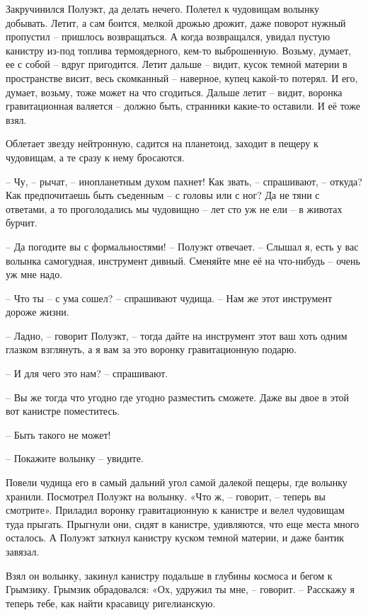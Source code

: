 \documentclass[ebook,oneside,final,openright]{memoir}
\begin{document}
\par
Закручинился Полуэкт, да делать нечего. Полетел к чудовищам волынку добывать. Летит, а сам боится, мелкой дрожью дрожит, даже поворот нужный пропустил – пришлось возвращаться. А когда возвращался, увидал пустую канистру из-под топлива термоядерного, кем-то выброшенную. Возьму, думает, ее с собой – вдруг пригодится. Летит дальше – видит, кусок темной материи в пространстве висит, весь скомканный – наверное, купец какой-то потерял. И его, думает, возьму, тоже может на что сгодиться. Дальше летит – видит, воронка гравитационная валяется – должно быть, странники какие-то оставили. И её тоже взял.\par
\par
Облетает звезду нейтронную, садится на планетоид, заходит в пещеру к чудовищам, а те сразу к нему бросаются. \par
– Чу, – рычат, – инопланетным духом пахнет! Как звать, – спрашивают, – откуда? Как предпочитаешь быть съеденным – с головы или с ног? Да не тяни с ответами, а то проголодались мы чудовищно – лет сто уж не ели – в животах бурчит.\par
– Да погодите вы с формальностями! – Полуэкт отвечает. – Слышал я, есть у вас волынка самогудная, инструмент дивный. Сменяйте мне её на что-нибудь – очень уж мне надо.\par
– Что ты – с ума сошел? – спрашивают чудища. – Нам же этот инструмент дороже жизни.\par
– Ладно, – говорит Полуэкт, – тогда дайте на инструмент этот ваш хоть одним глазком взглянуть, а я вам за это воронку гравитационную подарю.\par
– И для чего это нам? – спрашивают.\par
– Вы же тогда что угодно где угодно разместить сможете. Даже вы двое в этой вот канистре поместитесь. \par
– Быть такого не может!\par
– Покажите волынку – увидите.\par
\par
Повели чудища его в самый дальний угол самой далекой пещеры, где волынку хранили. Посмотрел Полуэкт на волынку. «Что ж, – говорит, – теперь вы смотрите». Приладил воронку гравитационную к канистре и велел чудовищам туда прыгать. Прыгнули они, сидят в канистре, удивляются, что еще места много осталось. А Полуэкт заткнул канистру куском темной материи, и даже бантик завязал.\par
\par
Взял он волынку, закинул канистру подальше в глубины космоса и бегом к Грымзику. Грымзик обрадовался: «Ох, удружил ты мне, – говорит. – Расскажу я теперь тебе, как найти красавицу ригелианскую.\par
\end{document}
